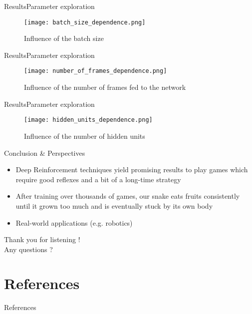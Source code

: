 \documentclass{beamer}
\begin{document}
\begin{frame}{Results}{Parameter exploration}
\begin{figure}[!htpb]
\centering
  \texttt{[image: batch\_size\_dependence.png]}
  \caption{Influence of the batch size}
  \label{batch_size}
\end{figure}
\end{frame} 

\begin{frame}{Results}{Parameter exploration}
\begin{figure}[b]
\centering
  \texttt{[image: number\_of\_frames\_dependence.png]}
  \caption{Influence of the number of frames fed to the network}
  \label{number_of_frames}
\end{figure}
\end{frame}

\begin{frame}{Results}{Parameter exploration}
\begin{figure}[!htbp]
\centering
  \texttt{[image: hidden\_units\_dependence.png]}
  \caption{Influence of the number of hidden units}
  \label{hidden_units}
\end{figure}
\end{frame}



\begin{frame}{Conclusion \& Perspectives}

\begin{itemize}
\item Deep Reinforcement techniques yield promising results to play games which require good reflexes and a bit of a long-time strategy
\item After training over thousands of games, our snake  eats fruits consistently until it grown too much and is eventually stuck by its own body 
\item Real-world applications (e.g. robotics)
\end{itemize}
\end{frame}

\begin{frame}{}
  \begin{center}
  \Huge Thank you for listening !\\Any questions ?
  \end{center}
\end{frame}

\section*{References}
\begin{frame}{References}


\end{frame}
\end{document}
